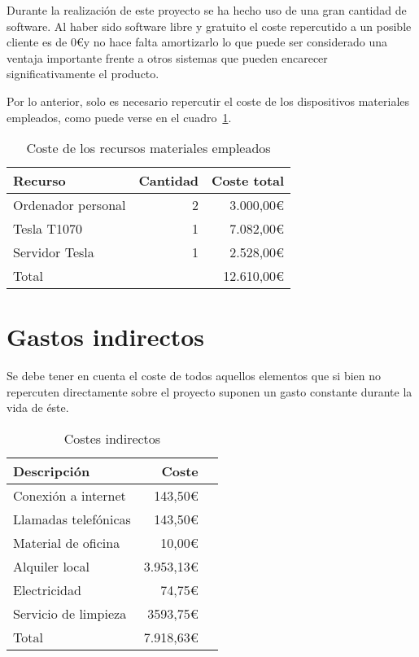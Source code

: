 Durante la realización de este proyecto se ha hecho uso de una gran cantidad de software. Al haber sido software libre y gratuito el coste repercutido a un posible cliente es de 0\euro y no hace falta amortizarlo lo que puede ser considerado una ventaja importante frente a otros sistemas que pueden encarecer significativamente el producto.

Por lo anterior, solo es necesario repercutir el coste de los dispositivos materiales empleados, como puede verse en el cuadro~\ref{tab:re_mat}.

\begin{table}
	\centering
	
	\begin{tabular}{|l|r|r|}
		\hline
		Recurso & Cantidad & Coste total \\
		\hline
		Ordenador personal & 2 & 3.000,00\euro \\
		\hline
		Tesla T1070 & 1 & 7.082,00\euro \\
		\hline
		Servidor Tesla & 1 & 2.528,00\euro\\
		\hline
		\hline
		\multicolumn{2}{|l|}{Total} & 12.610,00\euro\\
		\hline
	\end{tabular}
	\caption{Coste de los recursos materiales empleados}\label{tab:re_mat}
\end{table}

\section{Gastos indirectos}

Se debe tener en cuenta el coste de todos aquellos elementos que si bien no repercuten directamente sobre el proyecto suponen un gasto constante durante la vida de éste.

\begin{table}
	\centering
	
	\begin{tabular}{|l|r|r|}
		\hline
		Descripción & Coste \\
		\hline
		Conexión a internet & 143,50\euro \\
		\hline
		Llamadas telefónicas & 143,50\euro \\
		\hline
		Material de oficina & 10,00\euro\\
		\hline
		Alquiler local & 3.953,13\euro\\
		\hline
		Electricidad & 74,75\euro\\
		\hline
		Servicio de limpieza & 3593,75\euro\\
		
		\hline
		\hline
		Total & 7.918,63\euro\\
		\hline
	\end{tabular}
	\caption{Costes indirectos}\label{tab:cost_indi}
\end{table}

